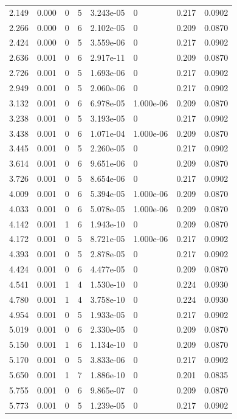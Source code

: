 \documentclass[preview]{standalone}
\begin{document}
{{\begin{tabular}{L{1.2cm}C{1.2cm} C{0.3cm}C{0.5cm} C{1.4cm}C{1.4cm} C{1.4cm}C{1.4cm}}
  2.149  &  0.000  & 0     &  5 &  3.243e-05  & 0  & 0.217 &  0.0902   \\ 
  2.266  &  0.000  & 0     &  6 &  2.102e-05  & 0  & 0.209 &  0.0870   \\ 
  2.424  &  0.000  & 0     &  5 &  3.559e-06  & 0  & 0.217 &  0.0902   \\ 
  2.636  &  0.001  & 0     &  6 &  2.917e-11  & 0  & 0.209 &  0.0870   \\ 
  2.726  &  0.001  & 0     &  5 &  1.693e-06  & 0  & 0.217 &  0.0902   \\ 
  2.949  &  0.001  & 0     &  5 &  2.060e-06  & 0  & 0.217 &  0.0902   \\ 
  3.132  &  0.001  & 0     &  6 &  6.978e-05  & 1.000e-06  & 0.209 &  0.0870   \\ 
  3.238  &  0.001  & 0     &  5 &  3.193e-05  & 0  & 0.217 &  0.0902   \\ 
  3.438  &  0.001  & 0     &  6 &  1.071e-04  & 1.000e-06  & 0.209 &  0.0870   \\ 
  3.445  &  0.001  & 0     &  5 &  2.260e-05  & 0  & 0.217 &  0.0902   \\ 
  3.614  &  0.001  & 0     &  6 &  9.651e-06  & 0  & 0.209 &  0.0870   \\ 
  3.726  &  0.001  & 0     &  5 &  8.654e-06  & 0  & 0.217 &  0.0902   \\ 
  4.009  &  0.001  & 0     &  6 &  5.394e-05  & 1.000e-06  & 0.209 &  0.0870   \\ 
  4.033  &  0.001  & 0     &  6 &  5.078e-05  & 1.000e-06  & 0.209 &  0.0870   \\ 
  4.142  &  0.001  & 1     &  6 &  1.943e-10  & 0  & 0.209 &  0.0870   \\ 
  4.172  &  0.001  & 0     &  5 &  8.721e-05  & 1.000e-06  & 0.217 &  0.0902   \\ 
  4.393  &  0.001  & 0     &  5 &  2.878e-05  & 0  & 0.217 &  0.0902   \\ 
  4.424  &  0.001  & 0     &  6 &  4.477e-05  & 0  & 0.209 &  0.0870   \\ 
  4.541  &  0.001  & 1     &  4 &  1.530e-10  & 0  & 0.224 &  0.0930   \\ 
  4.780  &  0.001  & 1     &  4 &  3.758e-10  & 0  & 0.224 &  0.0930   \\ 
  4.954  &  0.001  & 0     &  5 &  1.933e-05  & 0  & 0.217 &  0.0902   \\ 
  5.019  &  0.001  & 0     &  6 &  2.330e-05  & 0  & 0.209 &  0.0870   \\ 
  5.150  &  0.001  & 1     &  6 &  1.134e-10  & 0  & 0.209 &  0.0870   \\ 
  5.170  &  0.001  & 0     &  5 &  3.833e-06  & 0  & 0.217 &  0.0902   \\ 
  5.650  &  0.001  & 1     &  7 &  1.886e-10  & 0  & 0.201 &  0.0835   \\ 
  5.755  &  0.001  & 0     &  6 &  9.865e-07  & 0  & 0.209 &  0.0870   \\ 
  5.773  &  0.001  & 0     &  5 &  1.239e-05  & 0  & 0.217 &  0.0902   \\ 
\hline 
\end{tabular} 

}}
\end{document}
